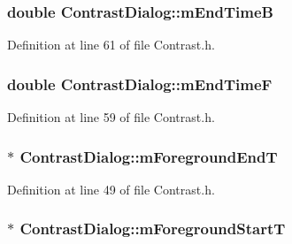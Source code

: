 \subsubsection[{\texorpdfstring{m\+End\+TimeB}{mEndTimeB}}]{\setlength{\rightskip}{0pt plus 5cm}double Contrast\+Dialog\+::m\+End\+TimeB}\hypertarget{class_contrast_dialog_ad603159661bcb8ab2b441943747bb4b9}{}\label{class_contrast_dialog_ad603159661bcb8ab2b441943747bb4b9}


Definition at line 61 of file Contrast.\+h.

\subsubsection[{\texorpdfstring{m\+End\+TimeF}{mEndTimeF}}]{\setlength{\rightskip}{0pt plus 5cm}double Contrast\+Dialog\+::m\+End\+TimeF}\hypertarget{class_contrast_dialog_a7b9a90f19099316e01d1fad54237a95f}{}\label{class_contrast_dialog_a7b9a90f19099316e01d1fad54237a95f}


Definition at line 59 of file Contrast.\+h.

\subsubsection[{\texorpdfstring{m\+Foreground\+EndT}{mForegroundEndT}}]{$\ast$ Contrast\+Dialog\+::m\+Foreground\+EndT}\hypertarget{class_contrast_dialog_ac9be2dbffc053e7b73384f4740e54a1e}{}\label{class_contrast_dialog_ac9be2dbffc053e7b73384f4740e54a1e}


Definition at line 49 of file Contrast.\+h.

\subsubsection[{\texorpdfstring{m\+Foreground\+StartT}{mForegroundStartT}}]{$\ast$ Contrast\+Dialog\+::m\+Foreground\+StartT}\hypertarget{class_contrast_dialog_a6d6e56d0208124b8c18783c21a85d415}{}\label{class_contrast_dialog_a6d6e56d0208124b8c18783c21a85d415}



